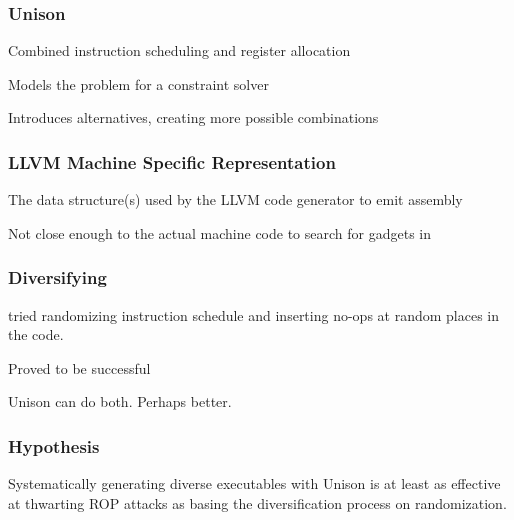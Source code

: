 \begin{frame}
	\frametitle{Unison}
	
	Combined instruction scheduling and register allocation

	\vspace{0.5cm}

	Models the problem for a constraint solver \cite{unison-docs}

	\vspace{0.5cm}

	Introduces alternatives, creating more possible combinations

\end{frame}

\begin{frame}
	\frametitle{LLVM Machine Specific Representation}
	
	The data structure(s) used by the LLVM code generator to emit assembly \cite{llvm-mir-lang-ref}

	\vspace{0.5cm}

	Not close enough to the actual machine code to search for gadgets in
	
\end{frame}

\begin{frame}
	\frametitle{Diversifying}

	\textcite{large-scale-automated} tried randomizing instruction schedule and inserting no-ops at random places in the code.

	\vspace{0.5cm}

	Proved to be successful

	\vspace{0.5cm}

	Unison can do both. Perhaps better.

\end{frame}

\begin{frame}
	\frametitle{Hypothesis}

	Systematically generating diverse executables with Unison is at least as effective at
	thwarting ROP attacks as basing the diversification process on randomization.
\end{frame}
